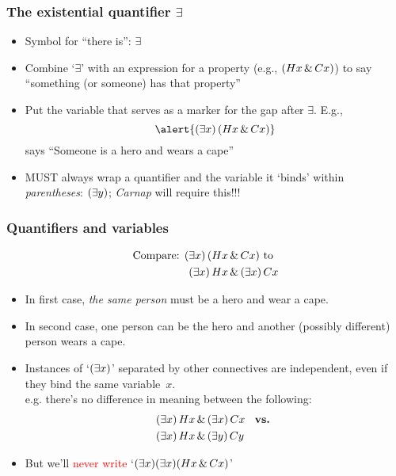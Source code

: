 \begin{frame}
  \frametitle{The existential quantifier $\exists$}

  \begin{itemize}[<+->]
    \item Symbol for ``there is'': \emph{$\exists$}
    \item Combine `$\exists$' with an expression for a property (e.g., $(Hx \,\&\,
    Cx)$) to say ``something (or someone) has that property''
    \item Put the variable that serves as a marker for the gap
    after $\exists$. E.g.,
    \[ \alert{\qt{\exists}{x}\,(H\qv{x} \eand C\qv{x})} \]
    says ``Someone is a hero and wears a cape''
    \item MUST always wrap a quantifier and the variable it `binds' within \emph{parentheses}: $(\exists y)$; \textit{Carnap} will require this!!!
  \end{itemize}
\end{frame}

\begin{frame}
\frametitle{Quantifiers and variables}
     \vspace{-1em}
    \begin{align*}
   \text{Compare:      } (\exists x)\,(Hx & \,\&\, Cx) \text{ to }\\
    (\exists x) \, Hx &\,\&\, (\exists x)\, Cx
    \end{align*}
    \vspace{-1em}
\begin{itemize}[<+->]
    \item In first case, \textit{the same person} must be a hero and wear a cape.
    \item In second case, one person can be the hero and another (possibly different) person wears a cape.
    \item Instances of `$(\exists x)$' separated by other connectives are independent, even if they bind the same variable~$x$. \\ e.g. there's no difference in meaning between the following: 
    \begin{align*}
     & (\exists x) \, Hx \,\&\, (\exists x)\, Cx \; \; \text{ \textbf{vs.} }\\
     & (\exists x) \, Hx \,\&\, (\exists y)\, Cy
    \end{align*}
    \item But we'll \textcolor{red}{never write} `$(\exists x)(\exists x) (Hx \,\&\, Cx)$' 
  \end{itemize}
\end{frame}

